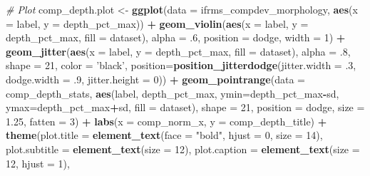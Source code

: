 \documentclass[
]{article}
\newenvironment{Shaded}{\begin{snugshade}}{\end{snugshade}}
\newcommand{\CommentTok}[1]{\textcolor[rgb]{0.56,0.35,0.01}{\textit{#1}}}
\newcommand{\DataTypeTok}[1]{\textcolor[rgb]{0.13,0.29,0.53}{#1}}
\newcommand{\DecValTok}[1]{\textcolor[rgb]{0.00,0.00,0.81}{#1}}
\newcommand{\FloatTok}[1]{\textcolor[rgb]{0.00,0.00,0.81}{#1}}
\newcommand{\KeywordTok}[1]{\textcolor[rgb]{0.13,0.29,0.53}{\textbf{#1}}}
\newcommand{\NormalTok}[1]{#1}
\newcommand{\OperatorTok}[1]{\textcolor[rgb]{0.81,0.36,0.00}{\textbf{#1}}}
\newcommand{\StringTok}[1]{\textcolor[rgb]{0.31,0.60,0.02}{#1}}
\begin{document}
\begin{Shaded}
\begin{Highlighting}[]
{\CommentTok{# Plot}
\NormalTok{comp_depth.plot <-}\StringTok{ }\KeywordTok{ggplot}\NormalTok{(}\DataTypeTok{data =}\NormalTok{ ifrms_compdev_morphology, }\KeywordTok{aes}\NormalTok{(}\DataTypeTok{x =}\NormalTok{ label, }\DataTypeTok{y =}\NormalTok{ depth_pct_max)) }\OperatorTok{+}
\StringTok{  }\KeywordTok{geom_violin}\NormalTok{(}\KeywordTok{aes}\NormalTok{(}\DataTypeTok{x =}\NormalTok{ label, }\DataTypeTok{y =}\NormalTok{ depth_pct_max, }\DataTypeTok{fill =}\NormalTok{ dataset), }\DataTypeTok{alpha =} \FloatTok{.6}\NormalTok{, }\DataTypeTok{position =}\NormalTok{ dodge, }\DataTypeTok{width =} \DecValTok{1}\NormalTok{) }\OperatorTok{+}\StringTok{ }
\StringTok{  }\KeywordTok{geom_jitter}\NormalTok{(}\KeywordTok{aes}\NormalTok{(}\DataTypeTok{x =}\NormalTok{ label, }\DataTypeTok{y =}\NormalTok{ depth_pct_max, }\DataTypeTok{fill =}\NormalTok{ dataset), }\DataTypeTok{alpha =} \FloatTok{.8}\NormalTok{, }\DataTypeTok{shape =} \DecValTok{21}\NormalTok{, }\DataTypeTok{color =} \StringTok{'black'}\NormalTok{,}
              \DataTypeTok{position=}\KeywordTok{position_jitterdodge}\NormalTok{(}\DataTypeTok{jitter.width =} \FloatTok{.3}\NormalTok{, }\DataTypeTok{dodge.width =} \FloatTok{.9}\NormalTok{, }\DataTypeTok{jitter.height =} \DecValTok{0}\NormalTok{)) }\OperatorTok{+}
\StringTok{  }\KeywordTok{geom_pointrange}\NormalTok{(}\DataTypeTok{data =}\NormalTok{ comp_depth_stats, }
                  \KeywordTok{aes}\NormalTok{(label, depth_pct_max, }\DataTypeTok{ymin=}\NormalTok{depth_pct_max}\OperatorTok{-}\NormalTok{sd, }\DataTypeTok{ymax=}\NormalTok{depth_pct_max}\OperatorTok{+}\NormalTok{sd, }\DataTypeTok{fill =}\NormalTok{ dataset), }
                  \DataTypeTok{shape =} \DecValTok{21}\NormalTok{, }\DataTypeTok{position =}\NormalTok{ dodge, }\DataTypeTok{size =} \FloatTok{1.25}\NormalTok{, }\DataTypeTok{fatten =} \DecValTok{3}\NormalTok{) }\OperatorTok{+}
\StringTok{  }\KeywordTok{labs}\NormalTok{(}\DataTypeTok{x =}\NormalTok{ comp_norm_x,}
       \DataTypeTok{y =}\NormalTok{ comp_depth_title) }\OperatorTok{+}\StringTok{ }
\StringTok{  }\KeywordTok{theme}\NormalTok{(}\DataTypeTok{plot.title =} \KeywordTok{element_text}\NormalTok{(}\DataTypeTok{face =} \StringTok{"bold"}\NormalTok{, }\DataTypeTok{hjust =} \DecValTok{0}\NormalTok{, }\DataTypeTok{size =} \DecValTok{14}\NormalTok{), }
        \DataTypeTok{plot.subtitle =} \KeywordTok{element_text}\NormalTok{(}\DataTypeTok{size =} \DecValTok{12}\NormalTok{),}
        \DataTypeTok{plot.caption =} \KeywordTok{element_text}\NormalTok{(}\DataTypeTok{size =} \DecValTok{12}\NormalTok{, }\DataTypeTok{hjust =} \DecValTok{1}\NormalTok{),}
}
\end{Highlighting}
\end{Shaded}
\end{document}
